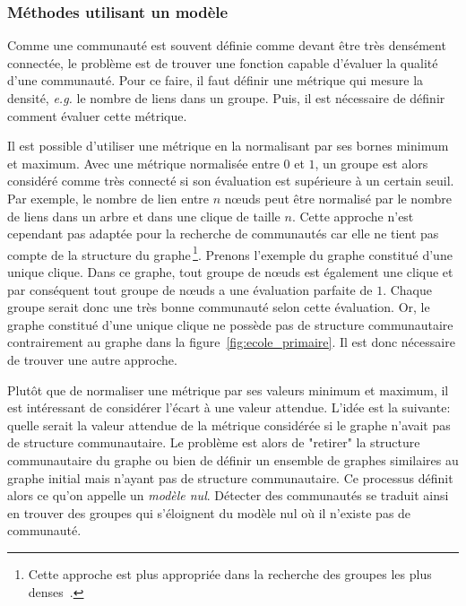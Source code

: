 \subsubsection{Méthodes utilisant un modèle}
\label{def:Modularite}
Comme une communauté est souvent définie comme devant être très densément connectée, le problème est de trouver une fonction capable d'évaluer la qualité d'une communauté.
Pour ce faire, il faut définir une métrique qui mesure la densité, \emph{e.g.} le nombre de liens dans un groupe.
Puis, il est nécessaire de définir comment évaluer cette métrique.

Il est possible d'utiliser une métrique en la normalisant par ses bornes minimum et maximum.
Avec une métrique normalisée entre $0$ et $1$, un groupe est alors considéré comme très connecté si son évaluation est supérieure à un certain seuil.
Par exemple, le nombre de lien entre $n$ n\oe uds peut être normalisé par le nombre de liens dans un arbre et dans une clique de taille $n$. 
Cette approche n'est cependant pas adaptée pour la recherche de communautés car elle ne tient pas compte de la structure du graphe\,\footnote{Cette approche est plus appropriée dans la recherche des groupes les plus denses~\cite{Balalau2015}.}.
Prenons l'exemple du graphe constitué d'une unique clique.
Dans ce graphe, tout groupe de n\oe uds est également une clique et par conséquent tout groupe de n\oe uds a une évaluation parfaite de $1$.
Chaque groupe serait donc une très bonne communauté selon cette évaluation.
Or, le graphe constitué d'une unique clique ne possède pas de structure communautaire contrairement au graphe dans la figure~\ref{fig:ecole_primaire}.
Il est donc nécessaire de trouver une autre approche.

\bigskip

Plutôt que de normaliser une métrique par ses valeurs minimum et maximum, il est intéressant de considérer l'écart à une valeur attendue.
L'idée est la suivante: quelle serait la valeur attendue de la métrique considérée si le graphe n'avait pas de structure communautaire.
Le problème est alors de "retirer" la structure communautaire du graphe ou bien de définir un ensemble de graphes similaires au graphe initial mais n'ayant pas de structure communautaire.
Ce processus définit alors ce qu'on appelle un \emph{modèle nul}.
Détecter des communautés se traduit ainsi en trouver des groupes qui s'éloignent du modèle nul où il n'existe pas de communauté.

